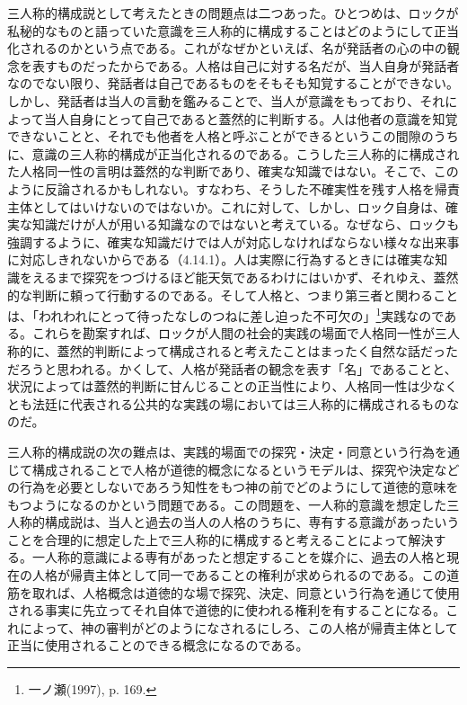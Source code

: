 \documentclass[a4j,oneside]{jsbook}
\begin{document}
三人称的構成説として考えたときの問題点は二つあった。ひとつめは、ロックが私秘的なものと語っていた意識を三人称的に構成することはどのようにして正当化されるのかという点である。これがなぜかといえば、名が発話者の心の中の観念を表すものだったからである。人格は自己に対する名だが、当人自身が発話者なのでない限り、発話者は自己であるものをそもそも知覚することができない。しかし、発話者は当人の言動を鑑みることで、当人が意識をもっており、それによって当人自身にとって自己であると蓋然的に判断する。人は他者の意識を知覚できないことと、それでも他者を人格と呼ぶことができるというこの間隙のうちに、意識の三人称的構成が正当化されるのである。こうした三人称的に構成された人格同一性の言明は蓋然的な判断であり、確実な知識ではない。そこで、このように反論されるかもしれない。すなわち、そうした不確実性を残す人格を帰責主体としてはいけないのではないか。これに対して、しかし、ロック自身は、確実な知識だけが人が用いる知識なのではないと考えている。なぜなら、ロックも強調するように、確実な知識だけでは人が対応しなければならない様々な出来事に対応しきれないからである（4.14.1）。人は実際に行為するときには確実な知識をえるまで探究をつづけるほど能天気であるわけにはいかず、それゆえ、蓋然的な判断に頼って行動するのである。そして人格と、つまり第三者と関わることは、「われわれにとって待ったなしのつねに差し迫った不可欠の」\footnote{一ノ瀬(1997), p. 169.}実践なのである。これらを勘案すれば、ロックが人間の社会的実践の場面で人格同一性が三人称的に、蓋然的判断によって構成されると考えたことはまったく自然な話だっただろうと思われる。かくして、人格が発話者の観念を表す「名」であることと、状況によっては蓋然的判断に甘んじることの正当性により、人格同一性は少なくとも法廷に代表される公共的な実践の場においては三人称的に構成されるものなのだ。
\par
三人称的構成説の次の難点は、実践的場面での探究・決定・同意という行為を通じて構成されることで人格が道徳的概念になるというモデルは、探究や決定などの行為を必要としないであろう知性をもつ神の前でどのようにして道徳的意味をもつようになるのかという問題である。この問題を、一人称的意識を想定した三人称的構成説は、当人と過去の当人の人格のうちに、専有する意識があったいうことを合理的に想定した上で三人称的に構成すると考えることによって解決する。一人称的意識による専有があったと想定することを媒介に、過去の人格と現在の人格が帰責主体として同一であることの権利が求められるのである。この道筋を取れば、人格概念は道徳的な場で探究、決定、同意という行為を通じて使用される事実に先立ってそれ自体で道徳的に使われる権利を有することになる。これによって、神の審判がどのようになされるにしろ、この人格が帰責主体として正当に使用されることのできる概念になるのである。
\par
\end{document}
